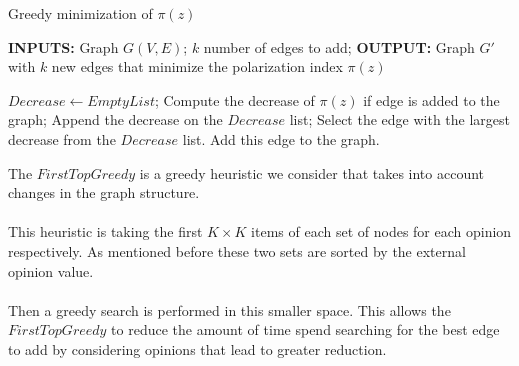     		\begin{algorithm}[H]
		
			\caption{Greedy minimization of $\pi(z)$}
			\label{alg:greedyAlgo}
			
			\begin{flushleft}
        				\textbf{INPUTS:} Graph $G(V, E)$; $k$ number of edges to add;
				\vspace{6pt}
        				\textbf{OUTPUT:} Graph $G'$ with $k$ new edges that minimize the polarization index $\pi(z)$
			\end{flushleft}
			
			\begin{algorithmic}[1]
					\STATE$Decrease \leftarrow Empty List$;
						\STATE Compute the decrease of $\pi(z)$ if edge is added to the graph;
						\STATE Append the decrease on the $Decrease$ list;
					\ENDFOR
					\STATE Select the edge with the largest decrease from the $Decrease$ list.
					\STATE Add this edge to the graph.
				\ENDFOR
			\end{algorithmic}
			
		\end{algorithm}

\vspace{10pt}
\clearpage



\noindent The $FirstTopGreedy$ is a greedy heuristic we consider that takes into account changes in the graph structure. 
\\
\\
This heuristic is taking the first $K \times K$ items of each set of nodes for each opinion respectively. As mentioned before these two sets are sorted by the external opinion value. 
\\
\\
Then a greedy search is performed in this smaller space. This allows the $FirstTopGreedy$ to reduce the amount of time spend searching for the best edge to add by considering opinions that lead to greater reduction.
\\
\\

